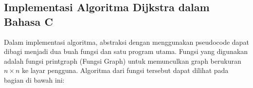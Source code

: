 \documentclass[conference]{IEEEtran}
\begin{document}
	\subsection{Implementasi Algoritma Dijkstra dalam Bahasa C}
	Dalam implementasi algoritma, abstraksi dengan menggunakan pseudocode dapat dibagi menjadi dua buah fungsi dan satu program utama. Fungsi yang digunakan adalah fungsi printgraph (Fungsi Graph) untuk memunculkan graph berukuran \begin{math} n \times n \end{math} ke layar pengguna. Algoritma dari fungsi tersebut dapat dilihat pada bagian di bawah ini:

	\begin{algorithm}[!ht]

		  \begin{center}
  	  \end{center}
  		    
	\end{algorithm}
\end{document}
